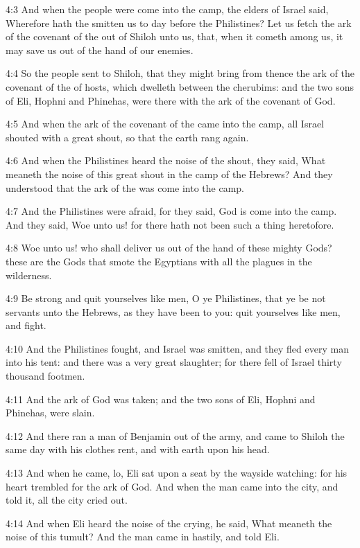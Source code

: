 4:3 And when the people were come into the camp, the elders of Israel
said, Wherefore hath the \LORD smitten us to day before the
Philistines? Let us fetch the ark of the covenant of the \LORD out of
Shiloh unto us, that, when it cometh among us, it may save us out of
the hand of our enemies.

4:4 So the people sent to Shiloh, that they might bring from thence
the ark of the covenant of the \LORD of hosts, which dwelleth between
the cherubims: and the two sons of Eli, Hophni and Phinehas, were
there with the ark of the covenant of God.

4:5 And when the ark of the covenant of the \LORD came into the camp,
all Israel shouted with a great shout, so that the earth rang again.

4:6 And when the Philistines heard the noise of the shout, they said,
What meaneth the noise of this great shout in the camp of the Hebrews?
And they understood that the ark of the \LORD was come into the camp.

4:7 And the Philistines were afraid, for they said, God is come into
the camp. And they said, Woe unto us! for there hath not been such a
thing heretofore.

4:8 Woe unto us! who shall deliver us out of the hand of these mighty
Gods? these are the Gods that smote the Egyptians with all the plagues
in the wilderness.

4:9 Be strong and quit yourselves like men, O ye Philistines, that ye
be not servants unto the Hebrews, as they have been to you: quit
yourselves like men, and fight.

4:10 And the Philistines fought, and Israel was smitten, and they fled
every man into his tent: and there was a very great slaughter; for
there fell of Israel thirty thousand footmen.

4:11 And the ark of God was taken; and the two sons of Eli, Hophni and
Phinehas, were slain.

4:12 And there ran a man of Benjamin out of the army, and came to
Shiloh the same day with his clothes rent, and with earth upon his
head.

4:13 And when he came, lo, Eli sat upon a seat by the wayside
watching: for his heart trembled for the ark of God. And when the man
came into the city, and told it, all the city cried out.

4:14 And when Eli heard the noise of the crying, he said, What meaneth
the noise of this tumult? And the man came in hastily, and told Eli.

